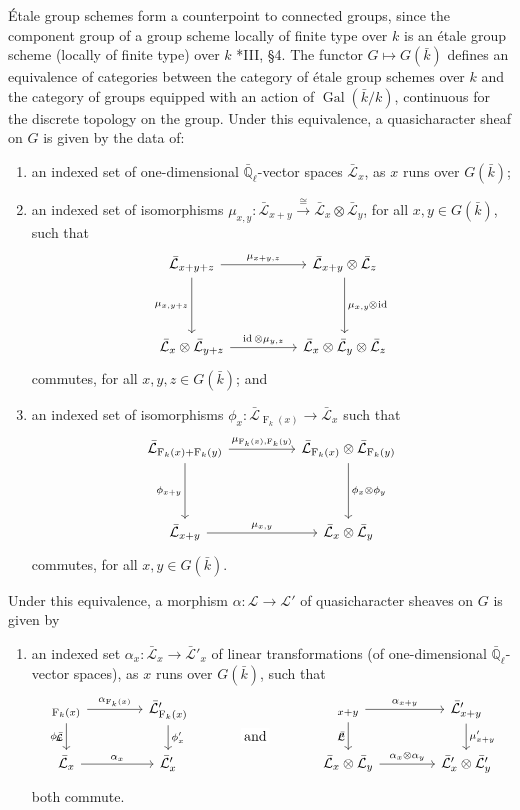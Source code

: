 \documentclass[11pt]{amsart}
\makeatletter
\theoremstyle{plain}
\theoremstyle{definition}
\theoremstyle{remark}
\newcommand{\EE}{\mathbb{\bar Q}_\ell}
\newcommand{\bFq}{\bar{k}}
\newcommand{\Fq}{k}
\DeclareMathOperator{\Gal}{Gal}
\newcommand{\Frob}[1]{\operatorname{F}_{#1}}
\DeclareMathOperator{\id}{id}
\newcommand{\iso}{{\ \cong\ }}
\newcommand{\qcs}[1]{{\mathcal{#1}}}
\newcommand{\gqcs}[1]{{\mathcal{\bar #1}}}
\newcommand{\labitem}[2]{%
\def\@itemlabel{\textbf{#1}}
\item
\def\@currentlabel{#1}\label{#2}}
\newcommand{\tight}[3]{\hspace{-#1pt}{#2}\hspace{-#3pt}}
\makeatother
\begin{document}
\'Etale group schemes form a counterpoint to connected groups,
since the component group of a group scheme locally of finite type over $\Fq$
is an \'etale group scheme (locally of finite type) over $\Fq$
\cite{vdGeer-Moonen:AbelianVarieties}*{III, \S 4}.
The functor $G \mapsto G(\bFq)$ defines an equivalence of categories
between the category of \'etale group schemes over $\Fq$ and the category of groups equipped
with an action of $\Gal(\bFq/\Fq)$, continuous for the discrete topology on the group.
Under this equivalence, a quasicharacter sheaf on $G$ is given by the data of:
\begin{enumerate}
 \labitem{(cs.0)}{cs.0} an indexed set of one-dimensional
  $\EE$-vector spaces $\gqcs{L}_x$, as $x$ runs over
  $G(\bFq)$;

 \labitem{(cs.1)}{cs.1} an indexed set of isomorphisms
  $\mu_{x,y} : \gqcs{L}_{x+y} \mathop{\longrightarrow}\limits^{\iso} \gqcs{L}_{x} \otimes\gqcs{L}_{y}$,
  for all $x,y \in G(\bFq)$, such that
  \[
   \begin{tikzcd}[row sep=40]
    \gqcs{L}_{x+y+z} \arrow{rr}{\mu_{x+y,z}} \arrow[swap]{d}{\mu_{x,y+z}}
    && \gqcs{L}_{x+y}\otimes\gqcs{L}_{z} \dar{\mu_{x,y} \tight{0.5}{\otimes}{1} \id} \\
    \gqcs{L}_{x} \otimes\gqcs{L}_{y+z} \arrow{rr}{\id \otimes\mu_{y,z}}
    && \gqcs{L}_{x} \otimes\gqcs{L}_{y} \otimes\gqcs{L}_{z}
   \end{tikzcd}
  \]
  commutes, for all $x,y,z\in G(\bFq)$; and

 \labitem{(cs.2)}{cs.2} an indexed set of isomorphisms $\phi_{x} : \gqcs{L}_{\Frob{\Fq}(x)} \to \gqcs{L}_x$
  such that
  \[
   \begin{tikzcd}[row sep=40]
    \gqcs{L}_{\Frob{\Fq}(x)+\Frob{\Fq}(y)} \arrow[swap]{d}{\phi_{x+y}} \arrow{rr}{\mu_{\Frob{\Fq}(x),\Frob{\Fq}(y)}}
    && \gqcs{L}_{\Frob{\Fq}(x)}\otimes\gqcs{L}_{\Frob{\Fq}(y)} \dar{\phi_x \tight{0}{\otimes}{0} \phi_y} \\
    \gqcs{L}_{x+y} \arrow{rr}{\mu_{x,y}}
    && \gqcs{L}_x \otimes\gqcs{L}_y
   \end{tikzcd}
  \]
  commutes, for all $x,y\in G(\bFq)$.
\end{enumerate}
Under this equivalence, a morphism $\alpha : \qcs{L} \to \qcs{L'}$ of quasicharacter sheaves on $G$ is given by 
\begin{enumerate}
 \labitem{(cs.3)}{cs.3} an indexed set $\alpha_x : \gqcs{L}_x \to \gqcs{L'}_x$
  of linear transformations (of one-dimensional $\EE$-vector spaces),
  as $x$ runs over $G(\bFq)$, such that
  \[
   \begin{tikzcd}[column sep=40]
    \arrow[swap]{d}{\phi_x} \gqcs{L}_{\Frob{\Fq}(x)} \rar{\alpha_{\Frob{\Fq}(x)}} & \gqcs{L'}_{\Frob{\Fq}(x)} \dar{\phi_x'}
    &\arrow[draw=none]{d}[pos=.4,description]{\text{\normalsize{and}}}
    & \arrow[swap]{d}{\mu} \gqcs{L}_{x+y} \rar{\alpha_{x+y}} & \gqcs{L'}_{x+y} \dar{\mu'_{x+y}} \\
    \gqcs{L}_x \rar{\alpha_x} & \gqcs{L'}_x
    & {} & \gqcs{L}_x\otimes\gqcs{L}_y \rar{\alpha_x\otimes\alpha_y} & \gqcs{L'}_x \otimes\gqcs{L'}_y
   \end{tikzcd}
  \]
  both commute.
\end{enumerate}
\end{document}
